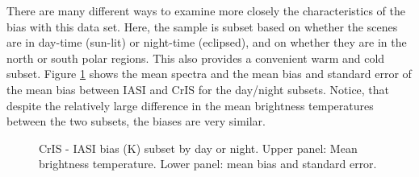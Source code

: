 \documentclass[twocolumn,10pt]{article}
\begin{document}
There are many different ways to examine more closely the characteristics of the bias with this data set. Here, the sample is subset based on whether the scenes are in day-time (sun-lit) or night-time (eclipsed), and on whether they are in the north or south polar regions. This also provides a convenient warm and cold subset. Figure \ref{fig:X5} shows the mean spectra and the mean bias and standard error of the mean bias between IASI and CrIS for the day/night subsets. Notice, that despite the
relatively large difference in the mean brightness temperatures between the two subsets, the biases are very similar.




\begin{figure}[htb]
    \centering
    \caption{CrIS - IASI bias (K) subset by day or night. Upper panel: Mean brightness temperature. Lower panel: mean bias and standard error.}
    \label{fig:X5}
\end{figure}
\end{document}

